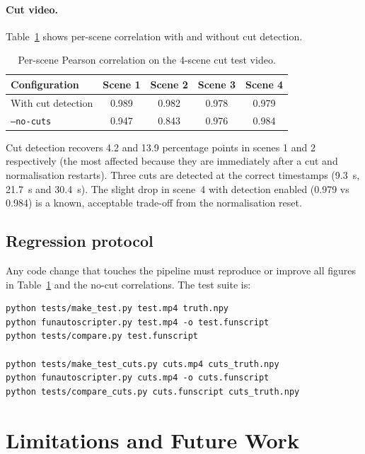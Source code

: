 \documentclass[12pt,a4paper]{article}
\begin{document}
\paragraph{Cut video.} Table~\ref{tab:cuts} shows per-scene correlation with
and without cut detection.

\begin{table}[H]
\centering
\caption{Per-scene Pearson correlation on the 4-scene cut test video.}
\label{tab:cuts}
\begin{tabular}{@{}lcccc@{}}
\toprule
Configuration & Scene 1 & Scene 2 & Scene 3 & Scene 4 \\
\midrule
With cut detection & 0.989 & 0.982 & 0.978 & 0.979 \\
\texttt{--no-cuts} & 0.947 & 0.843 & 0.976 & 0.984 \\
\bottomrule
\end{tabular}
\end{table}

Cut detection recovers 4.2 and 13.9 percentage points in scenes 1 and 2
respectively (the most affected because they are immediately after a cut and
normalisation restarts). Three cuts are detected at the correct timestamps
(9.3~s, 21.7~s and 30.4~s). The slight drop in scene~4 with detection enabled
(0.979 vs 0.984) is a known, acceptable trade-off from the normalisation reset.

\subsection{Regression protocol}

Any code change that touches the pipeline must reproduce or improve all
figures in Table~\ref{tab:cuts} and the no-cut correlations. The test suite is:

\begin{lstlisting}[style=pysnip]
python tests/make_test.py test.mp4 truth.npy
python funautoscripter.py test.mp4 -o test.funscript
python tests/compare.py test.funscript

python tests/make_test_cuts.py cuts.mp4 cuts_truth.npy
python funautoscripter.py cuts.mp4 -o cuts.funscript
python tests/compare_cuts.py cuts.funscript cuts_truth.npy
\end{lstlisting}

\section{Limitations and Future Work}
\label{sec:limits}
\end{document}

